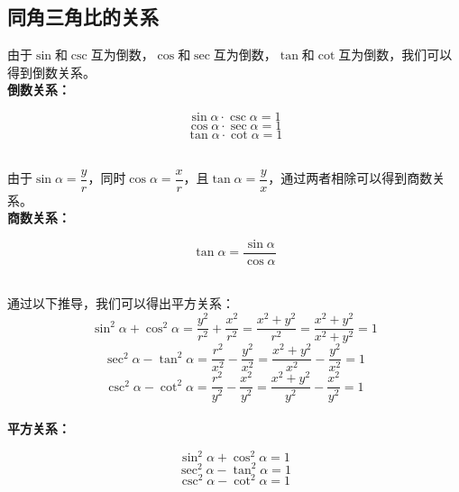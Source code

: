 \documentclass[UTF8]{ctexart}
\begin{document}
\newpage

\subsection{同角三角比的关系}
    由于$\sin$和$\csc$互为倒数，$\cos$和$\sec$互为倒数，$\tan$和$\cot$互为倒数，我们可以得到倒数关系。\\[3mm]
    \textbf{倒数关系：}
    \begin{large}
        \begin{equation*}
            \sin{\alpha} \cdot \csc{\alpha}=1
        \end{equation*}
        \begin{equation*}
            \cos{\alpha} \cdot \sec{\alpha}=1
        \end{equation*}   
        \begin{equation*}
            \tan{\alpha} \cdot \cot{\alpha}=1
        \end{equation*}
    \end{large}\\
    由于$\sin \alpha=\dfrac{y}{r}$，同时$\cos \alpha=\dfrac{x}{r}$，且$\tan \alpha=\dfrac{y}{x}$，通过两者相除可以得到商数关系。\\[3mm]
    \textbf{商数关系：}
    \begin{large}
        \begin{equation*}
            \tan \alpha=\frac{\sin \alpha}{\cos \alpha}
        \end{equation*}
    \end{large}\\[4mm]
    通过以下推导，我们可以得出平方关系：\vspace{5pt}
    \setcounter{equation}{0}
    \begin{equation}
        \sin^2{\alpha}+\cos^2{\alpha}
        =\frac{y^2}{r^2}+\frac{x^2}{r^2}
        =\frac{x^2+y^2}{r^2}
        =\frac{x^2+y^2}{x^2+y^2}
        =1
    \end{equation}\vspace{5pt}
    \begin{equation}
        \sec^2 \alpha-\tan^2 \alpha
        =\frac{r^2}{x^2}-\frac{y^2}{x^2}
        =\frac{x^2+y^2}{x^2}-\frac{y^2}{x^2}
        =1
    \end{equation}\vspace{5pt}
    \begin{equation}
        \csc^2 \alpha-\cot^2 \alpha
        =\frac{r^2}{y^2}-\frac{x^2}{y^2}
        =\frac{x^2+y^2}{y^2}-\frac{x^2}{y^2}
        =1
    \end{equation}\\
    \textbf{平方关系：}
    \begin{large}
        \begin{equation*}
            \sin^2 \alpha +\cos^2 \alpha=1
        \end{equation*}
        \begin{equation*}
            \sec^2 \alpha -\tan^2 \alpha=1
        \end{equation*}
        \begin{equation*}
            \csc^2 \alpha -\cot^2 \alpha=1
        \end{equation*}
    \end{large}
\end{document}

